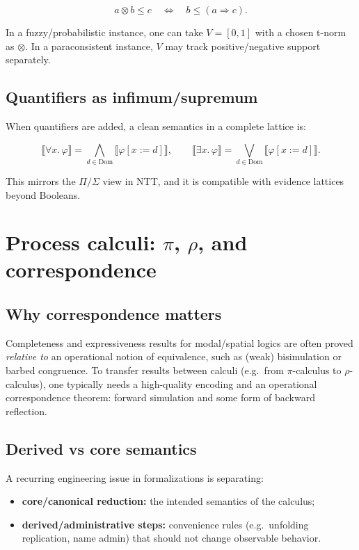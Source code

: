 \documentclass[11pt]{article}
\newcommand{\NTT}{\textsf{NTT}}
\newcommand{\rhocalc}{\textsf{\(\rho\)}-calculus}
\newcommand{\picalc}{\textsf{\(\pi\)}-calculus}
\begin{document}
\[
a \otimes b \le c \quad\Longleftrightarrow\quad b \le (a \Rightarrow c).
\]

In a fuzzy/probabilistic instance, one can take \(V = [0,1]\) with a chosen t-norm as \(\otimes\).
In a paraconsistent instance, \(V\) may track positive/negative support separately.

\subsection{Quantifiers as infimum/supremum}
When quantifiers are added, a clean semantics in a complete lattice is:

\[
\llbracket \forall x.\,\varphi \rrbracket = \bigwedge_{d \in \mathrm{Dom}} \llbracket \varphi[x:=d] \rrbracket,
\qquad
\llbracket \exists x.\,\varphi \rrbracket = \bigvee_{d \in \mathrm{Dom}} \llbracket \varphi[x:=d] \rrbracket.
\]

This mirrors the \(\Pi/\Sigma\) view in \NTT{}, and it is compatible with evidence lattices
beyond Booleans.

\section{Process calculi: \(\pi\), \(\rho\), and correspondence}

\subsection{Why correspondence matters}
Completeness and expressiveness results for modal/spatial logics are often proved
\emph{relative to} an operational notion of equivalence, such as (weak) bisimulation or barbed congruence.
To transfer results between calculi (e.g.\ from \picalc{} to \rhocalc{}), one typically needs a high-quality encoding
and an operational correspondence theorem: forward simulation and some form of backward reflection.

\subsection{Derived vs core semantics}
A recurring engineering issue in formalizations is separating:

\begin{itemize}
\item \textbf{core/canonical reduction:} the intended semantics of the calculus;
\item \textbf{derived/administrative steps:} convenience rules (e.g.\ unfolding replication, name admin)
that should not change observable behavior.
\end{itemize}
\end{document}
